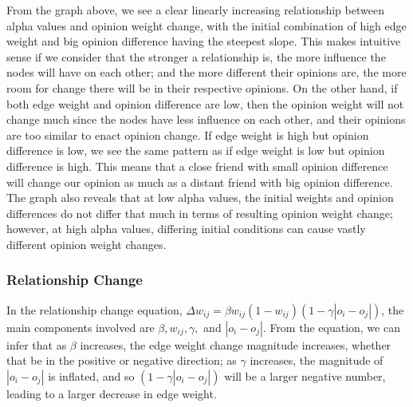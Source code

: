 \documentclass[11pt]{article}
\begin{document}
    \begin{center}
    \end{center}
    
    From the graph above, we see a clear linearly increasing relationship
between alpha values and opinion weight change, with the initial
combination of high edge weight and big opinion difference having the
steepest slope. This makes intuitive sense if we consider that the
stronger a relationship is, the more influence the nodes will have on
each other; and the more different their opinions are, the more room for
change there will be in their respective opinions. On the other hand, if
both edge weight and opinion difference are low, then the opinion weight
will not change much since the nodes have less influence on each other,
and their opinions are too similar to enact opinion change. If edge
weight is high but opinion difference is low, we see the same pattern as
if edge weight is low but opinion difference is high. This means that a
close friend with small opinion difference will change our opinion as
much as a distant friend with big opinion difference.\\

The graph also reveals that at low alpha values, the initial weights and
opinion differences do not differ that much in terms of resulting
opinion weight change; however, at high alpha values, differing initial
conditions can cause vastly different opinion weight changes.

\subsubsection{Relationship Change}

In the relationship change equation,
\(\Delta w_{ij} = \beta w_{ij}(1-w_{ij})(1-\gamma |o_i-o_j|)\), the main
components involved are \(\beta, w_{ij},\gamma,\) and \(|o_i - o_j|\).
From the equation, we can infer that as \(\beta\) increases, the edge
weight change magnitude increases, whether that be in the positive or
negative direction; as \(\gamma\) increases, the magnitude of
\(|o_i-o_j|\) is inflated, and so \((1-\gamma |o_i-o_j|)\) will be a
larger negative number, leading to a larger decrease in edge weight.
\end{document}
